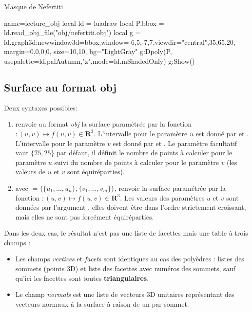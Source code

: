 \begin{demo}{Masque de Nefertiti}
\begin{luadraw}{name=lecture_obj}
local ld = luadraw
local P,bbox = ld.read_obj_file("obj/nefertiti.obj")
local g = ld.graph3d:new{window3d=bbox,window={-6,5,-7,7},viewdir={"central",35,65,20},
margin={0,0,0,0}, size={10,10}, bg="LightGray"}
g:Dpoly(P, {usepalette={ld.palAutumn,"z"},mode=ld.mShadedOnly})
g:Show()
\end{luadraw}
\end{demo}

\subsection{Surface au format obj}

Deux syntaxes possibles:
\begin{enumerate}
    \item {} renvoie au format \emph{obj} la surface paramétrée par la fonction $\colon(u,v) \mapsto f(u,v)\in \mathbf R^3$. L'intervalle pour le paramètre $u$ est donné par  et . L'intervalle pour le paramètre $v$ est donné par  et . Le paramètre facultatif  vaut $\{25,25\}$ par défaut, il définit le nombre de points à calculer pour le paramètre $u$ suivi du nombre de points à calculer pour le paramètre $v$ (les valeurs de $u$ et $v$ sont équiréparties).
    
    \item {} avec $=\{\{u_1,\ldots,u_n\}, \{v_1,\ldots,v_m\}\}$, renvoie la surface paramétrée par la fonction $\colon(u,v) \mapsto f(u,v)\in \mathbf R^3$. Les valeurs des paramètres $u$ et $v$ sont données par l'argument , elles doivent être dans l'ordre strictement croissant, mais elles ne sont pas forcément équiréparties.
\end{enumerate}
Dans les deux cas, le résultat n'est pas une liste de facettes mais une table à trois champs :
    \begin{itemize}
        \item Les champs \emph{vertices} et \emph{facets} sont identiques au cas des polyèdres : listes des sommets (points 3D) et liste des facettes avec numéros des sommets, sauf qu'ici les facettes sont toutes \textbf{triangulaires}.
        \item Le champ \emph{normals} est une liste de vecteurs 3D unitaires représentant des vecteurs normaux à la surface à raison de un par sommet.
    \end{itemize}



